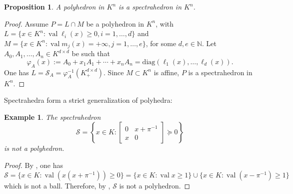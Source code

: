\documentclass[a4paper,oneside,10pt]{article}
\newtheorem{proposition}[theorem]{Proposition}
\newtheorem{example}[theorem]{Example}
\renewcommand{\span}[1]{{\text{span}(#1)}} %
\DeclareMathOperator{\val}{val}
\def\diag{\mathrm{diag}}
\begin{document}
\begin{proposition}
  A polyhedron in $K^n$ is a spectrahedron in $K^n$.
\end{proposition}
\begin{proof}
  Assume $P = L \cap M$ be a polyhedron in $K^n$, with
  $L = \{x \in K^n : \val \ell_i(x) \geq 0, i=1, \ldots, d\}$
  and $M = \{x \in K^n : \val m_j(x) = +\infty, j=1, \ldots, e\}$,
  for some $d, e \in \mathbb{N}$.
  Let $A_0,A_1,\ldots,A_n \in K^{d \times d}$ be such that
  $$
  \varphi_A(x) := A_0+x_1A_1+\cdots+x_nA_n = \diag(\ell_1(x), \ldots, \ell_d(x)).
  $$
  One has $L = \mathcal{S}_A = \varphi_A^{-1}(K^{d \times d}_+)$. Since $M \subset K^n$ is affine, 
  $P$ is a spectrahedron in $K^n$.
%
\end{proof}

Spectrahedra form a strict generalization of polyhedra:

\begin{example}
  The spectrahedron
  \[
  \mathcal{S} = \left\{x \in K : \begin{bmatrix} 0 & x + \pi^{-1} \\ x & 0 \end{bmatrix} \succeq 0\right\}
  \] 
  is not a polyhedron.
\end{example}
\begin{proof}
  By , one has $\mathcal{S} = \{x \in K : \val(x(x + \pi^{-1})) \geq 0\} =
  \{x \in K: \val x \ge 1\} \cup \{x \in K: \val (x - \pi^{-1}) \ge 1\}$ which is not a ball.
  Therefore, by , $\mathcal{S}$ is not a polyhedron.
\end{proof}
\end{document}
